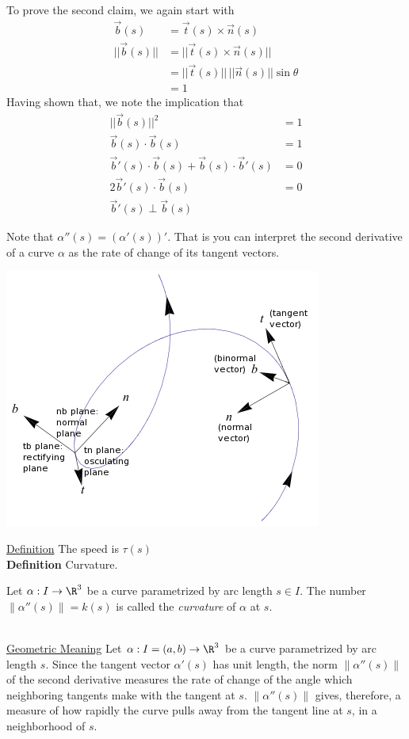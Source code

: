 \documentclass{article}
\begin{document}
To prove the second claim, we again start with 
\begin{align*}
    \vec{b}(s) &= \vec{t}(s) \times \vec{n}(s)\\
    ||\vec{b}(s)|| &= ||\vec{t}(s) \times \vec{n}(s)||\\
    &= ||\vec{t}(s)|| \, ||\vec{n}(s)|| \sin\theta\\
    &= 1
\end{align*}
Having shown that, we note the implication that
\begin{align*}
    ||\vec{b}(s)||^2 &= 1\\
    \vec{b}(s) \cdot \vec{b}(s) &= 1 \tag{Now take the derivative.}\\
    \vec{b}'(s) \cdot \vec{b}(s) + \vec{b}(s) \cdot \vec{b}'(s)&= 0 \\
    2 \vec{b}'(s) \cdot \vec{b}(s) &= 0 \\
    \vec{b}'(s) \perp \vec{b}(s)
\end{align*}

Note that $\alpha''(s) = (\alpha'(s))'$. That is you can interpret the second derivative of a curve $\alpha$ as the rate of change of its tangent vectors.

\includegraphics[scale=.9]{FrenetFrame.png}

\underline{Definition} The speed is $\tau(s)$ \\
\textbf{Definition} Curvature. 
\begin{defn}
Let $\alpha : I \to \R^3$ be a curve parametrized by arc length $s \in I$. The number $\|\alpha''(s) \|
= k(s)$ is called the \emph{curvature} of $\alpha$ at $s$.
\end{defn} \\
\underline{Geometric Meaning}
Let $\alpha : I = (a,b) \to \R^3$ be a curve parametrized by arc length $s$. Since the tangent
vector $\alpha'(s)$ has unit length, the norm $\| \alpha''(s) \|$ of the second derivative measures the
rate of change of the angle which neighboring tangents make with the tangent at $s$.
$\| \alpha''(s) \|$ gives, therefore, a measure of how rapidly the curve pulls away from the tangent
line at $s$, in a neighborhood of $s$.
\end{document}
